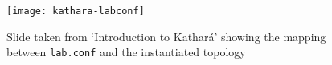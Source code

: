 \begin{figure}
  \centering
  \texttt{[image: kathara-labconf]}
  \caption{Slide taken from `Introduction to Kathará' showing the mapping between \texttt{lab.conf} and the instantiated topology}
  \label{fig:kathara-labconf}
\end{figure}
